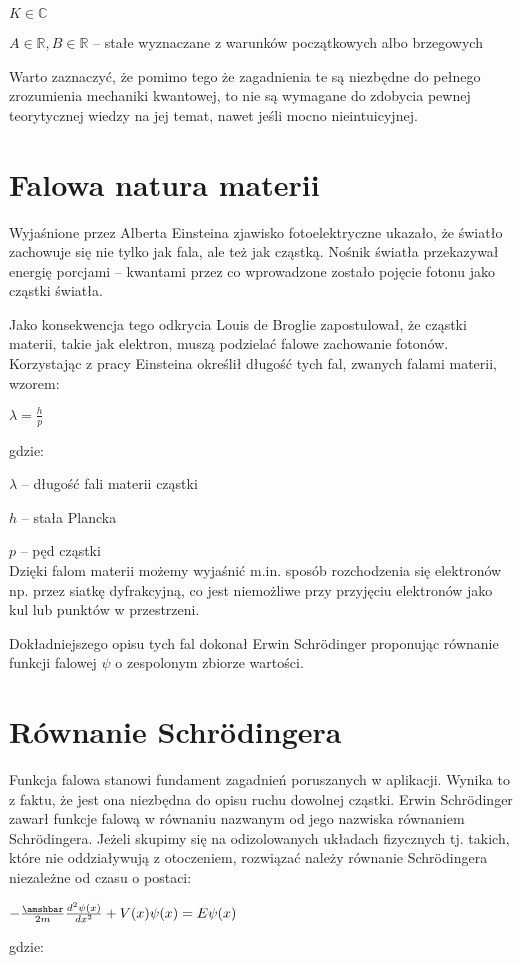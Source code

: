 \documentclass{SGGW-thesis}
\begin{document}
	$K \in \mathbb{C}$
		
	$A \in \mathbb{R}, B \in \mathbb{R}$ -- stałe wyznaczane z warunków początkowych albo brzegowych
	
	

	Warto zaznaczyć, że pomimo tego że zagadnienia te są niezbędne do pełnego zrozumienia mechaniki kwantowej, to nie są wymagane do zdobycia pewnej teorytycznej wiedzy na jej temat, nawet jeśli mocno nieintuicyjnej.
	\section{Falowa natura materii}
	Wyjaśnione przez Alberta Einsteina zjawisko fotoelektryczne ukazało, że światło zachowuje się nie tylko jak fala, ale też jak cząstką. Nośnik światła przekazywał energię porcjami -- kwantami przez co wprowadzone zostało pojęcie fotonu jako cząstki światła.
	
	 Jako konsekwencja tego odkrycia Louis de Broglie zapostulował, że cząstki materii, takie jak elektron, muszą podzielać falowe zachowanie fotonów. Korzystając z pracy Einsteina określił długość tych fal, zwanych falami materii, wzorem:
	 
	 \begin{center}
	 $\lambda=\frac{h}{p}$
	 \end{center}
	 
	 gdzie:
	 
	 $\lambda$ -- długość fali materii cząstki
	 
	 $h$ -- stała Plancka
	 
	 $p$ -- pęd cząstki\\
	 
	 Dzięki falom materii możemy wyjaśnić m.in. sposób rozchodzenia się elektronów np. przez siatkę dyfrakcyjną, co jest niemożliwe przy przyjęciu elektronów jako kul lub punktów w przestrzeni.
	 
	 Dokładniejszego opisu tych fal dokonał Erwin Schrödinger proponując równanie funkcji falowej $\psi$ o zespolonym zbiorze wartości. 
	 
	\section{Równanie Schrödingera}
	Funkcja falowa stanowi fundament zagadnień poruszanych w aplikacji. Wynika to z faktu, że jest ona niezbędna do opisu ruchu dowolnej cząstki. Erwin Schrödinger zawarł funkcje falową w równaniu nazwanym od jego nazwiska równaniem Schrödingera.  Jeżeli skupimy się na odizolowanych układach fizycznych tj. takich, które nie oddziaływują z otoczeniem, rozwiązać należy równanie Schrödingera niezależne od czasu o postaci:
	\begin{center}
	{\large $-\frac{\amshbar}{2m} \frac{d^2\psi(x)}{dx^2} + V(x)\psi(x) = E\psi(x)$}
	\end{center}
	gdzie:
	
\end{document}
